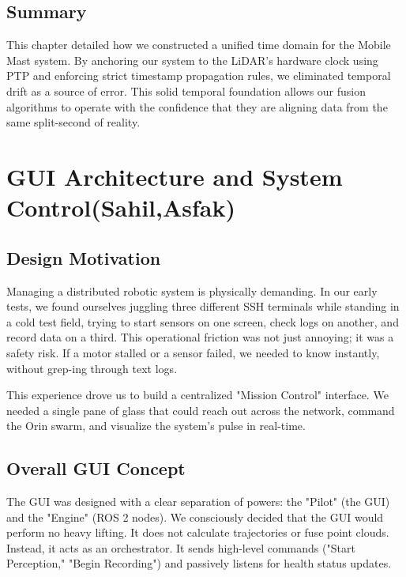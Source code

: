 \documentclass[12pt,a4paper]{report}
\begin{document}
{\section{Summary}
This chapter detailed how we constructed a unified time domain for the Mobile Mast system. By anchoring our system to the LiDAR's hardware clock using PTP and enforcing strict timestamp propagation rules, we eliminated temporal drift as a source of error. This solid temporal foundation allows our fusion algorithms to operate with the confidence that they are aligning data from the same split-second of reality.

\chapter{GUI Architecture and System Control(Sahil,Asfak)}

\section{Design Motivation}
Managing a distributed robotic system is physically demanding. In our early tests, we found ourselves juggling three different SSH terminals while standing in a cold test field, trying to start sensors on one screen, check logs on another, and record data on a third. This operational friction was not just annoying; it was a safety risk. If a motor stalled or a sensor failed, we needed to know instantly, without grep-ing through text logs.

This experience drove us to build a centralized "Mission Control" interface. We needed a single pane of glass that could reach out across the network, command the Orin swarm, and visualize the system's pulse in real-time.

\section{Overall GUI Concept}
The GUI was designed with a clear separation of powers: the "Pilot" (the GUI) and the "Engine" (ROS 2 nodes). We consciously decided that the GUI would perform no heavy lifting. It does not calculate trajectories or fuse point clouds. Instead, it acts as an orchestrator. It sends high-level commands ("Start Perception," "Begin Recording") and passively listens for health status updates.

}
\end{document}
